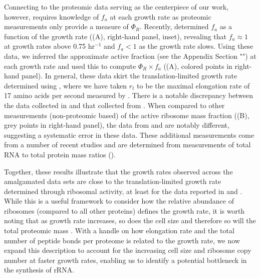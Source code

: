 Connecting  to the proteomic data serving as the centerpiece of
our work, however, requires knowledge
of $f_a$ at each growth rate as proteomic measurements only provide a
measure of $\Phi_R$. Recently, \cite{dai2016} determined $f_a$ as a function of
the growth rate ((A), right-hand panel, inset), revealing
that $f_a \approx 1$ at growth rates above 0.75 hr$^{-1}$ and $f_a < 1$ as the
growth rate slows. Using these data, we inferred the approximate active fraction
(see the Appendix Section "") at each growth rate and used this to compute
$\Phi_R \times f_a$ ((A), colored points in right-hand
panel). In general, these data skirt the translation-limited growth rate
determined using , where we have taken $r_t$ to be the maximal elongation
rate of 17 amino acids per second measured by \cite{dai2016}. There is a notable
discrepancy between the data collected in \cite{schmidt2016, li2014} and that
collected from \cite{valgepea2013, peebo2015}. When compared to other
measurements (non-proteomic based) of the active ribosome mass fraction
((B), grey points in right-hand panel), the data from
\cite{valgepea2013} and \cite{peebo2015} are notably different, suggesting a
systematic error in these data. These additional measurements come from a number
of recent studies and are determined from measurements of total RNA to total
protein mass ratios ().

Together, these results illustrate that the growth rates observed across the
amalgamated data sets are close to the translation-limited growth rate
determined through  ribosomal activity, at least for the data reported in
\cite{schmidt2016} and \cite{li2014}. While this is a useful framework to
consider how the relative abundance of ribosomes (compared to all other
proteins) defines the growth rate, it is worth noting that as growth rate
increases, so does the cell size and therefore so will the total proteomic mass
\citep{basan2015}. With a handle on how elongation rate and the total number of
peptide bonds per proteome is related to the growth rate, we now expand this
description to account for the increasing cell size and ribosome copy number at
faster growth rates,  enabling us to identify a potential bottleneck in the
synthesis of rRNA.

